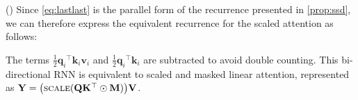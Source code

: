\begin{theorem} \label{sec:theor} (\lion)
Since \eqref{eq:lastlast} is the parallel form of the recurrence presented in \eqref{prop:ssd}, we can therefore express the equivalent recurrence for the scaled attention as follows:


\begin{tcolorbox}[colback=gray!2!white, colframe=black, boxrule=0.2mm, arc=4mm ,boxsep=0.1pt, left=0.0pt, right=0pt, top=0pt, bottom=0pt]
\end{tcolorbox}

The terms \(\frac{1}{2}{{\mathbf{q}_i}}^{\top} \mathbf{k}_i \mathbf{v}_i\) and \(\frac{1}{2}{{\mathbf{q}_i}}^{\top} \mathbf{k}_i\) are subtracted to avoid double counting. This bi-directional RNN is equivalent to scaled and masked linear attention, represented as \(\mathbf{Y} = \big(\textsc{scale}(\mathbf{Q}\mathbf{K}^{\top} \odot \mathbf{M})\big) \mathbf{V}\). 
\end{theorem}

